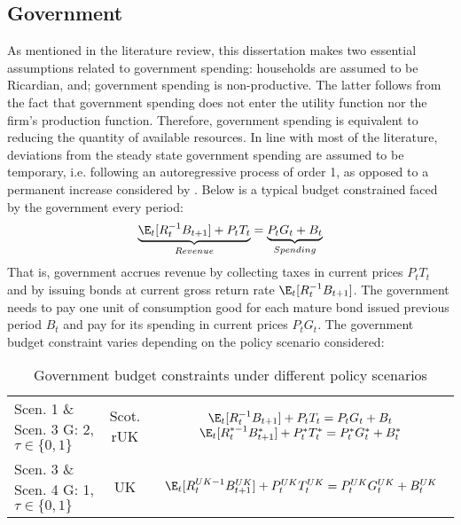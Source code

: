 \subsection{Government}

As mentioned in the literature review, this dissertation makes two essential assumptions related to government spending: households are assumed to be Ricardian, and; government spending is non-productive. The latter follows from the fact that government spending does not enter the utility function nor the firm's production function. Therefore, government spending is equivalent to reducing the quantity of available resources. In line with most of the literature, deviations from the steady state government spending are assumed to be temporary, i.e. following an autoregressive process of order 1, as opposed to a permanent increase considered by \textcite{baxter_1993_fiscal}. Below is a typical budget constrained faced by the government every period:
\begin{align}
    \underbrace{\E_t [R^{-1}_tB_{t+1}] + P_t T_t}_{Revenue} = \underbrace{P_tG_t + B_t}_{Spending}
\end{align}
That is, government accrues revenue by collecting taxes in current prices $P_t T_t$ and by issuing bonds at current gross return rate $\E_t [R^{-1}_tB_{t+1}]$. The government needs to pay one unit of consumption good for each mature bond issued previous period $B_t$ and pay for its spending in current prices $P_t G_t$. The government budget constraint varies depending on the policy scenario considered:
\begin{table}[H]
    \renewcommand{\arraystretch}{2}
    \centering
    \begin{tabular}{l|c|c}
    \makecell{Scen. 1 \& Scen. 3\\ G: 2, $\tau \in \{0, 1\}$} & \makecell{Scot. \\ rUK } & 
        \makecell{
            $\E_t [R^{-1}_tB_{t+1}] + P_t T_t = P_tG_t + B_t$\\
            $\E_t [{R^{*-1}_{t}}B^*_{t+1}] + P^*_tT^*_t = P^*_tG^*_t + B^*_t$
        }  \\ 
    \makecell{Scen. 3 \& Scen. 4\\ G: 1, $\tau \in \{0, 1\}$} & UK & 
    $\E_t [{R^{UK-1}_{t}}B^{UK}_{t+1}] + P^{UK}_tT^{UK}_t = P^{UK}_tG^{UK}_t + B^{UK}_t$
    \end{tabular}
    \vspace{0.5cm}
    \caption{Government budget constraints under different policy scenarios}
\end{table}
